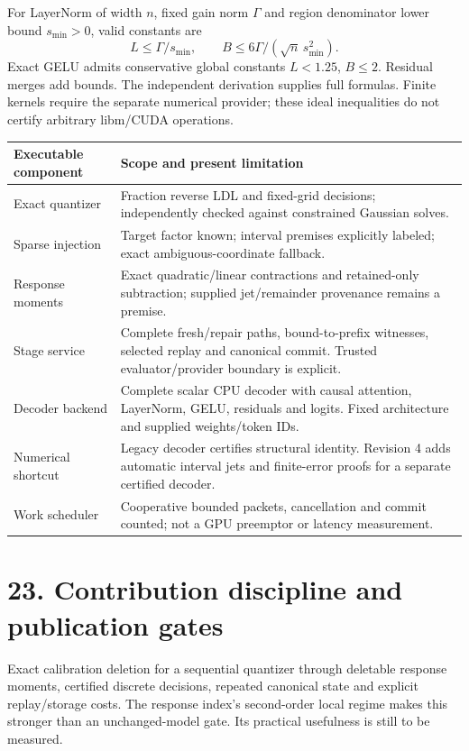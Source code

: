 For LayerNorm of width $n$, fixed gain norm $\Gamma$ and region denominator lower bound $s_{\min}>0$, valid constants are
\[
 L\leq\Gamma/s_{\min},\qquad B\leq6\Gamma/(\sqrt n\,s_{\min}^2).
\]
Exact GELU admits conservative global constants $L<1.25$, $B\leq2$. Residual merges add bounds. The independent derivation supplies full formulas. Finite kernels require the separate numerical provider; these ideal inequalities do not certify arbitrary libm/CUDA operations.

\begin{tabularx}{\linewidth}{@{}p{.29\linewidth}X@{}}\toprule
Executable component & Scope and present limitation\\\midrule
Exact quantizer & Fraction reverse LDL and fixed-grid decisions; independently checked against constrained Gaussian solves.\\
Sparse injection & Target factor known; interval premises explicitly labeled; exact ambiguous-coordinate fallback.\\
Response moments & Exact quadratic/linear contractions and retained-only subtraction; supplied jet/remainder provenance remains a premise.\\
Stage service & Complete fresh/repair paths, bound-to-prefix witnesses, selected replay and canonical commit. Trusted evaluator/provider boundary is explicit.\\
Decoder backend & Complete scalar CPU decoder with causal attention, LayerNorm, GELU, residuals and logits. Fixed architecture and supplied weights/token IDs.\\
Numerical shortcut & Legacy decoder certifies structural identity. Revision 4 adds automatic interval jets and finite-error proofs for a separate certified decoder.\\
Work scheduler & Cooperative bounded packets, cancellation and commit counted; not a GPU preemptor or latency measurement.\\\bottomrule
\end{tabularx}

\newpage
\section*{23. Contribution discipline and publication gates}
 Exact calibration deletion for a sequential quantizer through deletable response moments, certified discrete decisions, repeated canonical state and explicit replay/storage costs. The response index's second-order local regime makes this stronger than an unchanged-model gate. Its practical usefulness is still to be measured.

